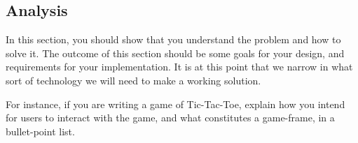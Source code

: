 \subsection{Analysis}

\label{sec:analysis}

In this section, you should show that you understand the problem and
how to solve it. The outcome of this section should be some goals for
your design, and requirements for your implementation. It is at this
point that we narrow in what sort of technology we will need to make a
working solution.

For instance, if you are writing a game of Tic-Tac-Toe, explain how
you intend for users to interact with the game, and what constitutes a
game-frame, in a bullet-point list.

